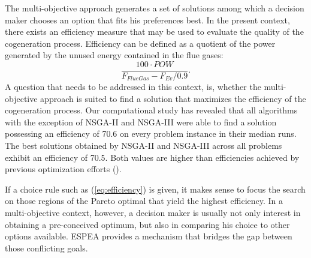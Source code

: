 
The multi-objective approach generates a set of solutions among which a decision maker chooses an option that fits his preferences best. In the present context, there exists an efficiency measure that may be used to evaluate the quality of the cogeneration process. Efficiency can be defined as a quotient of the power generated by the unused energy contained in the flue gases:
%
\begin{equation}
\label{eq:efficiency}
\frac{100 \cdot POW}{F_{FlueGas} - F_{Ev}/0.9}.
\end{equation}
%
A question that needs to be addressed in this context, is, whether the multi-objective approach is suited to find a solution that maximizes the efficiency of the cogeneration process. Our computational study has revealed that all algorithms with the exception of NSGA-II and NSGA-III were able to find a solution possessing an efficiency of 70.6 on every problem instance in their median runs. The best solutions obtained by NSGA-II and NSGA-III across all problems exhibit an efficiency of 70.5. Both values are higher than efficiencies achieved by previous optimization efforts (\cite{Seijo2016309}).

If a choice rule such as (\ref{eq:efficiency}) is given, it makes sense to focus the search on those regions of the Pareto optimal that yield the highest efficiency. In a multi-objective context, however, a decision maker is usually not only interest in obtaining a pre-conceived optimum, but also in comparing his choice to other options available. ESPEA provides a mechanism that bridges the gap between those conflicting goals.






